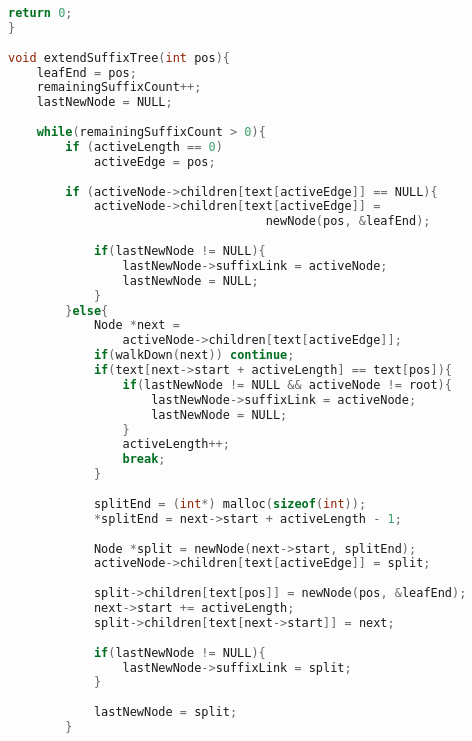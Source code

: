 \begin{lstlisting}[language=C++]
    return 0;
}
 
void extendSuffixTree(int pos){
    leafEnd = pos;
 	remainingSuffixCount++; 
    lastNewNode = NULL;
 
    while(remainingSuffixCount > 0){ 
        if (activeLength == 0)
            activeEdge = pos;
 
        if (activeNode->children[text[activeEdge]] == NULL){
            activeNode->children[text[activeEdge]] =
                                    newNode(pos, &leafEnd);
 
            if(lastNewNode != NULL){
                lastNewNode->suffixLink = activeNode;
                lastNewNode = NULL;
            }
        }else{
            Node *next = 
            	activeNode->children[text[activeEdge]];
            if(walkDown(next)) continue;
            if(text[next->start + activeLength] == text[pos]){
                if(lastNewNode != NULL && activeNode != root){
                    lastNewNode->suffixLink = activeNode;
                    lastNewNode = NULL;
                } 
                activeLength++;
                break;
            }
 
            splitEnd = (int*) malloc(sizeof(int));
            *splitEnd = next->start + activeLength - 1;
 
            Node *split = newNode(next->start, splitEnd);
            activeNode->children[text[activeEdge]] = split;
 
            split->children[text[pos]] = newNode(pos, &leafEnd);
            next->start += activeLength;
            split->children[text[next->start]] = next;
 
            if(lastNewNode != NULL){         
                lastNewNode->suffixLink = split;
            }
 
            lastNewNode = split;
        }
\end{lstlisting}
\newpage
